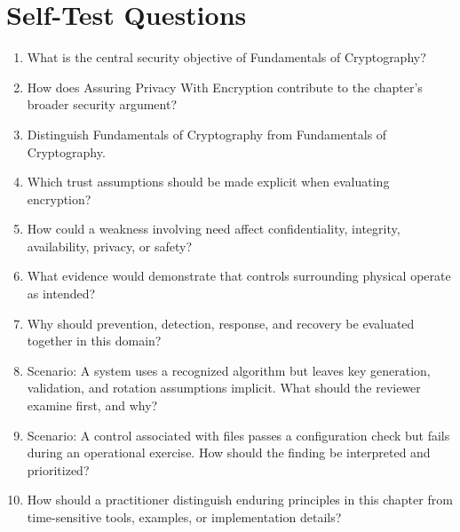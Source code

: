 \documentclass[11pt]{article}
\begin{document}
\section*{Self-Test Questions}
\begin{enumerate}
\item What is the central security objective of Fundamentals of Cryptography?
\item How does Assuring Privacy With Encryption contribute to the chapter's broader security argument?
\item Distinguish Fundamentals of Cryptography from Fundamentals of Cryptography.
\item Which trust assumptions should be made explicit when evaluating encryption?
\item How could a weakness involving need affect confidentiality, integrity, availability, privacy, or safety?
\item What evidence would demonstrate that controls surrounding physical operate as intended?
\item Why should prevention, detection, response, and recovery be evaluated together in this domain?
\item Scenario: A system uses a recognized algorithm but leaves key generation, validation, and rotation assumptions implicit. What should the reviewer examine first, and why?
\item Scenario: A control associated with files passes a configuration check but fails during an operational exercise. How should the finding be interpreted and prioritized?
\item How should a practitioner distinguish enduring principles in this chapter from time-sensitive tools, examples, or implementation details?
\end{enumerate}
\end{document}
